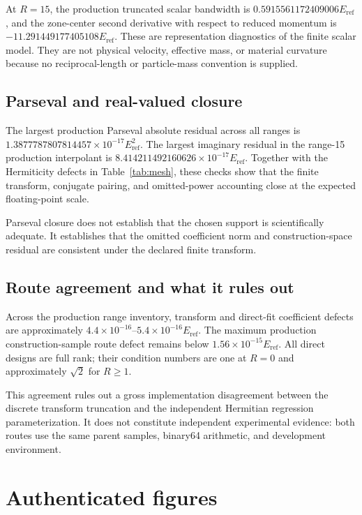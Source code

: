 \documentclass[11pt]{article}
\newcommand{\eref}{E_{\mathrm{ref}}}
\begin{document}
At $R=15$, the production truncated scalar bandwidth is
$0.5915561172409006\eref$, and the zone-center second derivative with respect to reduced
momentum is $-11.291449177405108\eref$.  These are representation diagnostics of the
finite scalar model.  They are not physical velocity, effective mass, or material
curvature because no reciprocal-length or particle-mass convention is supplied.

\subsection{Parseval and real-valued closure}

The largest production Parseval absolute residual across all ranges is
$1.3877787807814457\times10^{-17}\eref^2$.  The largest imaginary residual in the
range-15 production interpolant is
$8.414211492160626\times10^{-17}\eref$.  Together with the Hermiticity defects in
Table~\ref{tab:mesh}, these checks show that the finite transform, conjugate pairing, and
omitted-power accounting close at the expected floating-point scale.

Parseval closure does not establish that the chosen support is scientifically adequate.
It establishes that the omitted coefficient norm and construction-space residual are
consistent under the declared finite transform.

\subsection{Route agreement and what it rules out}

Across the production range inventory, transform and direct-fit coefficient defects are
approximately $4.4\times10^{-16}$--$5.4\times10^{-16}\eref$.  The maximum production
construction-sample route defect remains below $1.56\times10^{-15}\eref$.  All direct
designs are full rank; their condition numbers are one at $R=0$ and approximately
$\sqrt2$ for $R\ge1$.

This agreement rules out a gross implementation disagreement between the discrete
transform truncation and the independent Hermitian regression parameterization.  It does
not constitute independent experimental evidence: both routes use the same parent
samples, binary64 arithmetic, and development environment.

\section{Authenticated figures}
\end{document}
